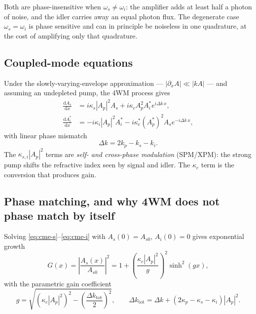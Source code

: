 Both are phase-insensitive when $\omega_s\neq\omega_i$: the amplifier adds at
least half a photon of noise, and the idler carries away an equal photon flux.
The degenerate case $\omega_s=\omega_i$ is phase sensitive and can in principle
be noiseless in one quadrature, at the cost of amplifying only that quadrature.

\subsection{Coupled-mode equations}

Under the slowly-varying-envelope approximation --- $|\partial_x A| \ll |kA|$
--- and assuming an undepleted pump, the 4WM process gives
\begin{align}
  \frac{\mathrm{d}A_s}{\mathrm{d}x}
    &= i\kappa_s |A_p|^{2} A_s
     + i\kappa_c A_p^{2} A_i^{*} e^{i\Delta k\,x}, \label{eq:cme-s}\\[2pt]
  \frac{\mathrm{d}A_i^{*}}{\mathrm{d}x}
    &= -i\kappa_i |A_p|^{2} A_i^{*}
     - i\kappa_c^{*} (A_p^{*})^{2} A_s e^{-i\Delta k\,x}, \label{eq:cme-i}
\end{align}
with linear phase mismatch
\begin{equation}
  \Delta k = 2k_p - k_s - k_i .
  \label{eq:linear-mismatch}
\end{equation}
The $\kappa_{s,i}|A_p|^{2}$ terms are \emph{self- and cross-phase modulation}
(SPM/XPM): the strong pump shifts the refractive index seen by signal and idler.
The $\kappa_c$ term is the conversion that produces gain.

\subsection{Phase matching, and why 4WM does not phase match by itself}

Solving \eqref{eq:cme-s}--\eqref{eq:cme-i} with $A_s(0)=A_{s0}$, $A_i(0)=0$
gives exponential growth
\begin{equation}
  G(x) = \left|\frac{A_s(x)}{A_{s0}}\right|^{2}
       = 1 + \left(\frac{\kappa_c|A_p|^{2}}{g}\right)^{2}\sinh^{2}(gx),
  \label{eq:gain-cme}
\end{equation}
with the parametric gain coefficient
\begin{equation}
  g = \sqrt{\left(\kappa_c|A_p|^{2}\right)^{2}
            - \left(\frac{\Delta k_{\mathrm{tot}}}{2}\right)^{2}},
  \qquad
  \Delta k_{\mathrm{tot}} = \Delta k + (2\kappa_p - \kappa_s - \kappa_i)|A_p|^{2}.
  \label{eq:g-coefficient}
\end{equation}

